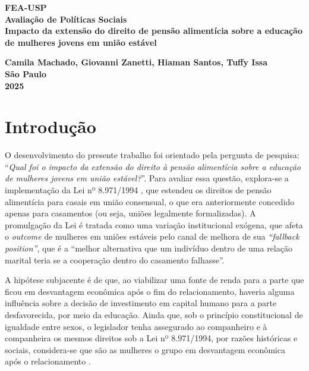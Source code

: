 \documentclass[12pt,oneside,a4paper]{article}
\begin{document}
\begin{titlepage}
    \begin{center}
        \Large
        \textbf{FEA-USP}\\[1cm]
        \textbf{Avaliação de Políticas Sociais}\\[4cm]
        
        \textbf{\huge Impacto da extensão do direito de pensão alimentícia sobre a educação de mulheres jovens em união estável}\\[1cm]
        
        \large

        \textbf{Camila Machado, Giovanni Zanetti,  Hiaman Santos, Tuffy Issa }\\[6cm]
        
        \textbf{São Paulo}\\
        \textbf{2025}
    \end{center}
\end{titlepage}


\newpage
\tableofcontents
\newpage

\section{Introdução}

O desenvolvimento do presente trabalho foi orientado pela pergunta de pesquisa: ``\textit{Qual foi o impacto da extensão do direito à pensão alimentícia sobre a educação de mulheres jovens em união estável?}''. Para avaliar essa questão, explora-se a implementação da Lei nº 8.971/1994 \cite{brasil_lei8971_1994}, que estendeu os direitos de pensão alimentícia para casais em união consensual, o que era anteriormente concedido apenas para casamentos (ou seja, uniões legalmente formalizadas). A promulgação da Lei é tratada como uma variação institucional exógena, que afeta o \textit{outcome} de mulheres em uniões estáveis pelo canal de melhora de sua \textit{``fallback position''}, que é a ``melhor alternativa que um indivíduo dentro de uma relação marital teria se a cooperação dentro do casamento falhasse''\cite{agarwal1997bargaining}. 

A hipótese subjacente é de que, ao viabilizar uma fonte de renda para a parte que ficou em desvantagem econômica após o fim do relacionamento, haveria alguma influência sobre a decisão de investimento em capital humano para a parte desfavorecida, por meio da educação. Ainda que, sob o princípio constitucional de igualdade entre sexos, o legislador tenha assegurado ao companheiro e à companheira os mesmos direitos sob a Lei nº 8.971/1994, por razões históricas e sociais, considera-se que são as mulheres o grupo em desvantagem econômica após o relacionamento \cite{smock1999effect,gadalla2008impact}.  
\end{document}
